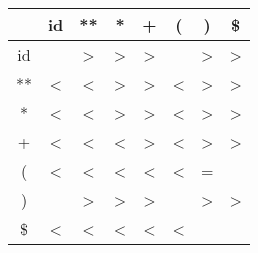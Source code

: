 \documentclass{article}
\begin{document}
\begin{center}
\begin{tabular}{ |c|c|c|c|c|c|c|c| } 
\hline
& id & ** & * & + & ( & ) & \$ \\
\hline
id &  & > & > & > &  & > & > \\
\hline
** & <  & <  & > & > & < & > & > \\
\hline
* & < & < & > & > & < & > & > \\
\hline
+ & < & < & < & > & < & > & > \\
\hline
( & < & < & < & < & < & = & \\
\hline
) &   & > & > & > &   & > & > \\
\hline
\$ & < & < & < & < & < &   &   \\
\hline

 
\end{tabular}
\end{center}
\end{document}
